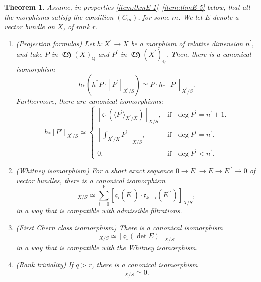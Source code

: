 \documentclass[11pt]{article}
\theoremstyle{plain}
\newtheorem{thm}{Theorem}
\theoremstyle{definition}
\newcommand{\QBbb}{\mathbb Q}
\newcommand{\cfrak}{\mathfrak c}
\newcommand{\bis}{\prime\prime}
\DeclareMathOperator{\CHfrak}{\mathfrak{CH}}
\begin{document}
\begin{thm}\label{thm:F}
Assume, in properties \eqref{item:thmE-1}--\eqref{item:thmE-5} below, that all the morphisms satisfy the condition $(C_{m})$, for some $m$. We let $E$ denote a vector bundle on $X$, of rank $r$.

\begin{enumerate}
\item\label{item:thmE-1} (Projection formulas) Let $h\colon X^{\prime}\to X$ be a morphism of relative dimension $n^{\prime}$, and take $P$ in $\CHfrak(X)_{\QBbb}$ and $P^{\prime}$ in $\CHfrak(X^{\prime})_{\QBbb}$.
Then, there is a canonical isomorphism
\begin{displaymath}
h_\ast (h^\ast P \cdot [P^{\prime}]_{X^{\prime}/S} ) \simeq P \cdot h_{\ast} [P^{\prime}]_{X^{\prime}/S}.
\end{displaymath}
Furthermore, there are canonical isomorphisms:
\begin{displaymath}
h_\ast [P']_{X^{\prime}/S} \simeq
\begin{cases}
\left[ \cfrak_1 (\langle P^{\prime} \rangle_{X^{\prime}/X})\right]_{X/S}, & \text{if }\; \deg P^{\prime}=n^{\prime}+1.\\[5pt]
\left[ \int_{X^{\prime}/X}P^{\prime} \right]_{X/S}, & \text{if }\; \deg P^{\prime} = n^{\prime}. \\[5pt]
0, & \text{if }\; \deg P^{\prime} < n^{\prime}.
\end{cases}
\end{displaymath}
\item (Whitney isomorphism) For a short exact sequence $0 \to E^{\prime}\to E \to E^{\bis} \to 0$ of vector bundles, there is a canonical isomorphism
\begin{displaymath}
[\cfrak_{k}(E)]_{X/S}\simeq \sum_{i=0}^{k} [\cfrak_{i}(E^{\prime})\cdot\cfrak_{k-i}(E^{\bis})]_{X/S},
\end{displaymath}
in a way that is compatible with admissible filtrations.
\item(First Chern class isomorphism) There is a canonical isomorphism
\begin{displaymath}
[\cfrak_1(E)]_{X/S} \simeq [\cfrak_1(\det E)]_{X/S}
\end{displaymath}
in a way that is compatible with the Whitney isomorphism.
\item (Rank triviality) If $q >r$, there is a canonical isomorphism
\begin{displaymath}
[ \cfrak_q(E)]_{X/S} \simeq 0.
\end{displaymath}

\end{enumerate}
\end{thm}
\end{document}
